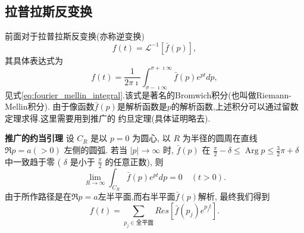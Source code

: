 \subsection{拉普拉斯反变换}
\label{subsec:inverse_laplace_transform}
前面对于拉普拉斯反变换(亦称逆变换)
\begin{equation}
    f(t) = \mathcal{L}^{-1} [ \bar{f}(p)],
\end{equation}
其具体表达式为
\begin{equation}
    f(t)=\frac{1}{2 \pi \imath} \int_{\sigma-\imath \infty}^{\sigma+\imath \infty} \bar{f}(p) e^{ p t} dp, 
\end{equation}
见式\eqref{eq:fourier_mellin_integral}.该式是著名的Bromwich积分(也叫做Riemann-Mellin积分).
由于像函数$\bar{f}(p)$是解析函数是$p$的解析函数,上述积分可以通过留数定理求得.这里需要用到推广的
约旦定理(具体证明略去).

\textbf{推广的约当引理} 设 $C_R$ 是以 $p=0$ 为圆心, 以 $R$ 为半径的圆周在直线 $\Re p=a(>0)$ 左侧的圆弧. 若当 $|p| \rightarrow \infty$ 时, $\bar{f}(p)$ 在 $\frac{\pi}{2}-\delta \leqslant \operatorname{Arg} p \leqslant \frac{3}{2} \pi+\delta$ 中一致趋于零 ( $\delta$ 是小于 $\frac{\pi}{2}$ 的任意正数), 则
$$
\lim _{R \rightarrow \infty} \int_{C_R} \bar{f}(p) e^{p t} d p=0 \quad(t>0) .
$$
由于所作路径是在$\Re p = a$左半平面,而右半平面$\bar{f}(p)$解析, 最终我们得到
\begin{equation}
    f(t) = \sum_{p_j \in \text{全平面}} Res [ \bar{f}(p_j) e^{p_j t}].
\end{equation}


